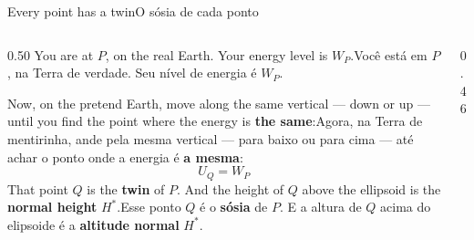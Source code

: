 \documentclass[aspectratio=169,11pt]{beamer}
\newcommand{\tr}[2]{\ifEN#2\else#1\fi}
\newcommand{\bnum}[1]{\textbf{\textcolor{mTeal}{#1}}}
\begin{document}
\begin{frame}{\tr{O sósia de cada ponto}{Every point has a twin}}
  \begin{columns}[T]
    \begin{column}{0.50\textwidth}
      \tr{Você está em $P$, na Terra de verdade. Seu nível de energia é $W_P$.}{You are at $P$,
      on the real Earth. Your energy level is $W_P$.}
      \medskip

      \tr{Agora, na Terra de mentirinha, ande pela mesma vertical --- para baixo ou para cima
      --- até achar o ponto onde a energia é \bnum{a mesma}:}{Now, on the pretend Earth, move
      along the same vertical --- down or up --- until you find the point where the energy is
      \bnum{the same}:}
      \[ \boxed{\; U_Q = W_P \;} \]
      \tr{Esse ponto $Q$ é o \bnum{sósia} de $P$. E a altura de $Q$ acima do elipsoide é a
      \textcolor{corIdeal}{\textbf{altitude normal}} $H^{*}$.}{That point $Q$ is the
      \bnum{twin} of $P$. And the height of $Q$ above the ellipsoid is the
      \textcolor{corIdeal}{\textbf{normal height}} $H^{*}$.}
    \end{column}
    \begin{column}{0.46\textwidth}
      \centering
    \end{column}
  \end{columns}
\end{frame}
\end{document}
